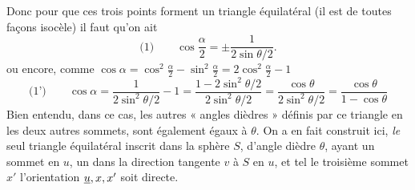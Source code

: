 \documentclass[11pt,a4paper]{article}
\begin{document}
Donc pour que ces trois points forment un triangle équilatéral (il est de toutes façons isocèle) il faut qu'on ait
\[
  \text{(1)} \qquad \cos\frac{\alpha}{2} = \pm \frac{1}{2 \sin \theta/2} .
\]
ou encore, comme $\cos\alpha = \cos^2\frac{\alpha}{2} - \sin^2\frac{\alpha}{2} = 2\cos^2\frac{\alpha}{2} - 1$
\[
  \text{(1')} \qquad \cos\alpha = \frac{1}{2\sin^2\theta/2} - 1 = \frac{1 - 2\sin^2\theta/2}{2\sin^2\theta/2} = \frac{\cos\theta}{2\sin^2\theta/2} = \frac{\cos\theta}{1 - \cos\theta}
\]
Bien entendu, dans ce cas, les autres « angles dièdres » définis par ce triangle en les deux autres sommets, sont également égaux à $\theta$. On a en fait construit ici,  \emph{le} seul triangle équilatéral inscrit dans la sphère $S$, d'angle dièdre $\theta$, ayant un sommet en $u$, un   dans la direction tangente $v$ à $S$ en $u$, et  tel  le troisième sommet $x'$ l'orientation $\uncertain{u},x,x'$ soit directe.
\end{document}
